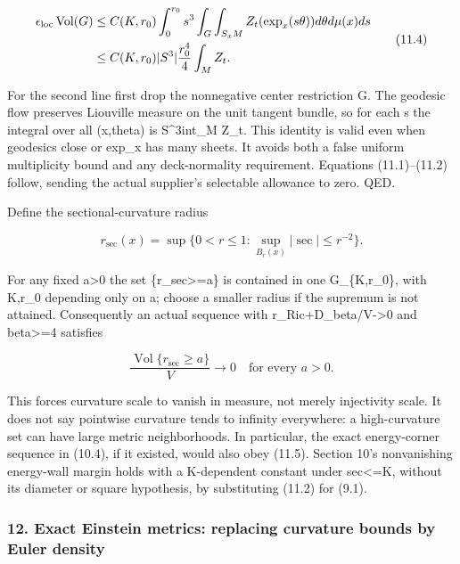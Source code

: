 \documentclass[
  10pt,
]{article}
\begin{document}
\[
\begin{aligned}
 \epsilon_{\rm loc}\operatorname{Vol}(G)
 &\le C(K,r_0)\int_0^{r_0}s^3
          \int_G\int_{S_xM}Z_t(\exp_x(s\theta))d\theta d\mu(x)ds\\
 &\le C(K,r_0)|S^3|\frac{r_0^4}{4}\int_M Z_t.
\end{aligned}                                                     \tag{11.4}
\]

For the second line first drop the nonnegative center restriction G. The
geodesic flow preserves Liouville measure on the unit tangent bundle, so
for each s the integral over all (x,theta) is
\textbar S\^{}3\textbar int\_M Z\_t. This identity is valid even when
geodesics close or exp\_x has many sheets. It avoids both a false
uniform multiplicity bound and any deck-normality requirement. Equations
(11.1)--(11.2) follow, sending the actual supplier's selectable
allowance to zero. QED.

Define the sectional-curvature radius

\[
 r_{\sec}(x)=\sup\{0<r\le1:\sup_{B_r(x)}|\sec|\le r^{-2}\}.
\]

For any fixed a\textgreater0 the set \{r\_sec\textgreater=a\} is
contained in one G\_\{K,r\_0\}, with K,r\_0 depending only on a; choose
a smaller radius if the supremum is not attained. Consequently an actual
sequence with r\_Ric+D\_beta/V-\textgreater0 and beta\textgreater=4
satisfies

\[
       \frac{\operatorname{Vol}\{r_{\sec}\ge a\}}V\to0
                                  \quad\text{for every }a>0.    \tag{11.5}
\]

This forces curvature scale to vanish in measure, not merely injectivity
scale. It does not say pointwise curvature tends to infinity everywhere:
a high-curvature set can have large metric neighborhoods. In particular,
the exact energy-corner sequence in (10.4), if it existed, would also
obey (11.5). Section 10's nonvanishing energy-wall margin holds with a
K-dependent constant under \textbar sec\textbar\textless=K, without its
diameter or square hypothesis, by substituting (11.2) for (9.1).

\hypertarget{exact-einstein-metrics-replacing-curvature-bounds-by-euler-density}{%
\subsubsection{12. Exact Einstein metrics: replacing curvature bounds by
Euler
density}\label{exact-einstein-metrics-replacing-curvature-bounds-by-euler-density}}
\end{document}
